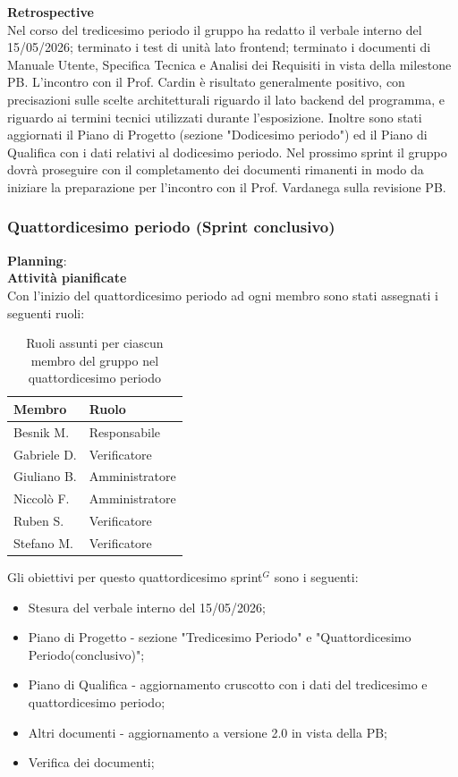 \documentclass[a4paper,10pt]{article}
\begin{document}
\textbf{Retrospective} \\
Nel corso del tredicesimo periodo il gruppo ha redatto il verbale interno del 15/05/2026; terminato i test di unità lato frontend; terminato i documenti di Manuale Utente, Specifica Tecnica e Analisi dei Requisiti in vista della milestone PB. L'incontro con il Prof. Cardin è risultato generalmente positivo, con precisazioni sulle scelte architetturali riguardo il lato backend del programma, e riguardo ai termini tecnici utilizzati durante l'esposizione. Inoltre sono stati aggiornati il Piano di Progetto (sezione "Dodicesimo periodo") ed il Piano di Qualifica con i dati relativi al dodicesimo periodo.
Nel prossimo sprint il gruppo dovrà proseguire con il completamento dei documenti rimanenti in modo da iniziare la preparazione per l'incontro con il Prof. Vardanega sulla revisione PB.

\subsubsection{Quattordicesimo periodo (Sprint conclusivo)}
\textbf{Planning}: \\
\textbf{Attività pianificate} \\ Con l'inizio del quattordicesimo periodo ad ogni membro sono stati assegnati i seguenti ruoli:
\begin{table}[H]
  \centering
  \begin{tabular}{|l|l|}
    \hline
    \textbf{Membro} & \textbf{Ruolo} \\
    \hline
    Besnik M.  & Responsabile \\
    \hline
    Gabriele D.  & Verificatore \\
    \hline
    Giuliano B. & Amministratore \\
    \hline
    Niccolò F. & Amministratore \\
    \hline
    Ruben S. & Verificatore \\
    \hline
    Stefano M.  & Verificatore \\
    \hline
  \end{tabular}
  \caption{Ruoli assunti per ciascun membro del gruppo nel quattordicesimo periodo}
\end{table}

Gli obiettivi per questo quattordicesimo sprint$^G$ sono i seguenti:
\begin{itemize}
  \item Stesura del verbale interno del 15/05/2026;
  \item Piano di Progetto - sezione "Tredicesimo Periodo" e "Quattordicesimo Periodo(conclusivo)";
  \item Piano di Qualifica - aggiornamento cruscotto con i dati del tredicesimo e quattordicesimo periodo;
  \item Altri documenti - aggiornamento a versione 2.0 in vista della PB;
  \item Verifica dei documenti;
\end{itemize}
\end{document}
